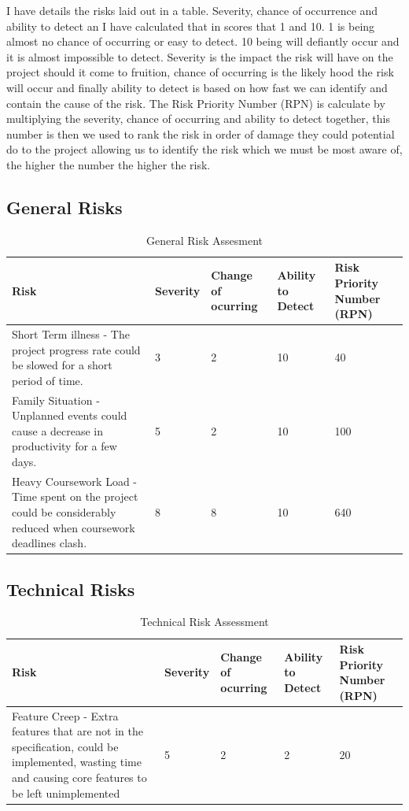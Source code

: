 \documentclass{report}
\begin{document}
I have details the risks laid out in a table. Severity, chance of occurrence and ability to detect an I have calculated that in scores that 1 and 10.
1 is being almost no chance of occurring or easy to detect. 10 being will defiantly occur and it is almost impossible to detect.
Severity is the impact the risk will have on the project should it come to fruition, chance of occurring is the likely hood the risk will occur and finally ability to detect is based on how fast we can identify and contain the cause of the risk.
The Risk Priority Number (RPN) is calculate by multiplying the severity, chance of occurring and ability to detect together, this number is then we used to rank the risk in order of damage they could potential do to the project allowing us to identify the risk which we must be most aware of, the higher the number the higher the risk.
\pagebreak

\subsection{General Risks}

\begin{table}[h]

\begin{tabularx}{\textwidth}{|X|X|X|X|X|}
\hline 
  Risk & Severity & Change of ocurring & Ability to Detect & Risk Priority Number (RPN)
\\\hline
Short Term illness - The project progress rate could be
slowed for a short period of time.&
3&
2&
10&
40\\\hline
Family Situation - Unplanned events could cause a decrease in productivity for a few days.&
5&
2&
10&
100\\\hline
Heavy Coursework Load - Time spent on the project could be considerably reduced when coursework deadlines clash.&
8&
8&
10&
640\\\hline

  \end{tabularx}
  \caption{General Risk Assesment}
  \label{sec:riskas}
\end{table}

\subsection{Technical Risks}
\label{sec:tech}
\begin{table}[h]
\begin{tabularx}{\textwidth}{|X|X|X|X|X|}
\hline 
Risk & Severity & Change of ocurring & Ability to Detect & Risk Priority Number (RPN) \\ 
\hline 
Feature Creep - Extra features that are not in the specification, could be implemented, wasting time and causing core features to be left unimplemented & 5 & 2 & 2 & 20 \\ 
\hline 
\end{tabularx} 
\caption{Technical Risk Assessment}
\end{table}
\end{document}
